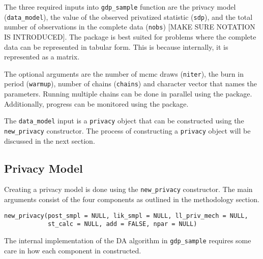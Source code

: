 The three required inputs into \texttt{gdp\_sample} function are the privacy model (\texttt{data\_model}), the value
of the observed privatized statistic (\texttt{sdp}), and the total number of observations
in the complete data (\texttt{nobs}) {[}MAKE SURE NOTATION IS INTRODUCED{]}. The 
package is best suited for problems where the complete data can be represented in
tabular form. This is because internally, it is represented as a matrix.

The optional arguments are the number of mcmc draws (\texttt{niter}), the
burn in period (\texttt{warmup}), number of chains (\texttt{chains}) and character
vector that names the parameters. Running multiple chains can be done in parallel
using the  package. Additionally, progress can be monitored
using the  package.

The \texttt{data\_model} input is a \texttt{privacy}
object that can be constructed using the \texttt{new\_privacy} constructor. The
process of constructing a \texttt{privacy} object will be discussed in the next section.

\hypertarget{privacy-model}{%
\subsection{Privacy Model}\label{privacy-model}}

Creating a privacy model is done using the \texttt{new\_privacy} constructor. The
main arguments consist of the four components as outlined in the methodology
section.

\begin{verbatim}
new_privacy(post_smpl = NULL, lik_smpl = NULL, ll_priv_mech = NULL,
            st_calc = NULL, add = FALSE, npar = NULL)
\end{verbatim}

The internal implementation of the DA algorithm in \texttt{gdp\_sample} requires
some care in how each component in constructed.

